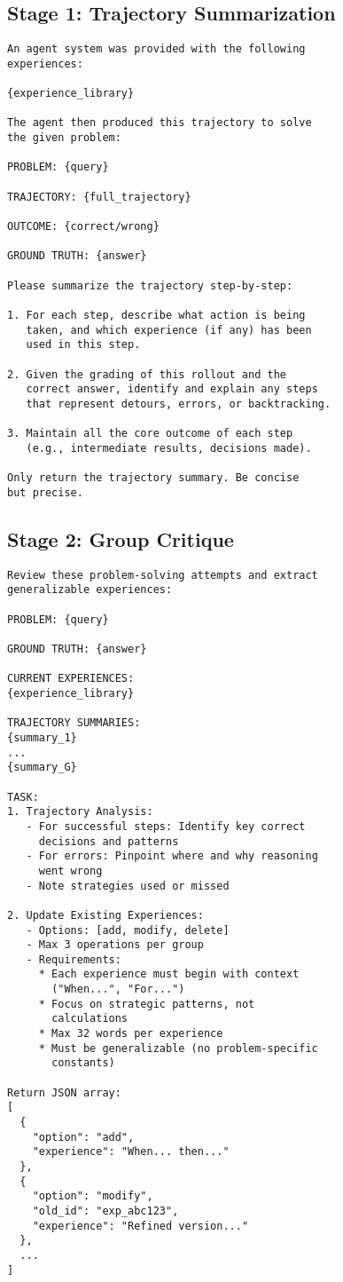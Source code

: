 \documentclass[11pt,letterpaper]{article}
\begin{document}
\subsection{Stage 1: Trajectory Summarization}

\begin{lstlisting}[caption=Full Summarization Prompt]
An agent system was provided with the following 
experiences:

{experience_library}

The agent then produced this trajectory to solve 
the given problem:

PROBLEM: {query}

TRAJECTORY: {full_trajectory}

OUTCOME: {correct/wrong}

GROUND TRUTH: {answer}

Please summarize the trajectory step-by-step:

1. For each step, describe what action is being 
   taken, and which experience (if any) has been 
   used in this step.

2. Given the grading of this rollout and the 
   correct answer, identify and explain any steps 
   that represent detours, errors, or backtracking.

3. Maintain all the core outcome of each step 
   (e.g., intermediate results, decisions made).

Only return the trajectory summary. Be concise 
but precise.
\end{lstlisting}

\subsection{Stage 2: Group Critique}

\begin{lstlisting}[caption=Full Group Critique Prompt]
Review these problem-solving attempts and extract 
generalizable experiences:

PROBLEM: {query}

GROUND TRUTH: {answer}

CURRENT EXPERIENCES:
{experience_library}

TRAJECTORY SUMMARIES:
{summary_1}
...
{summary_G}

TASK:
1. Trajectory Analysis:
   - For successful steps: Identify key correct 
     decisions and patterns
   - For errors: Pinpoint where and why reasoning 
     went wrong
   - Note strategies used or missed

2. Update Existing Experiences:
   - Options: [add, modify, delete]
   - Max 3 operations per group
   - Requirements:
     * Each experience must begin with context 
       ("When...", "For...")
     * Focus on strategic patterns, not 
       calculations
     * Max 32 words per experience
     * Must be generalizable (no problem-specific 
       constants)

Return JSON array:
[
  {
    "option": "add",
    "experience": "When... then..."
  },
  {
    "option": "modify",
    "old_id": "exp_abc123",
    "experience": "Refined version..."
  },
  ...
]
\end{lstlisting}
\end{document}
